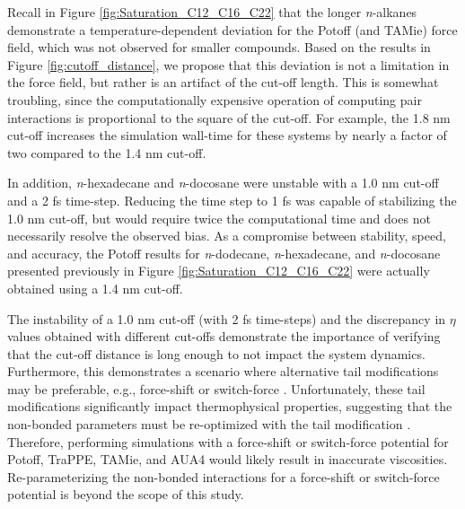 \documentclass[preprint,review,12pt]{elsarticle}
\begin{document}
	Recall in Figure \ref{fig:Saturation_C12_C16_C22} that the longer \textit{n}-alkanes demonstrate a temperature-dependent deviation for the Potoff (and TAMie) force field, which was not observed for smaller compounds. Based on the results in Figure \ref{fig:cutoff_distance}, we propose that this deviation is not a limitation in the force field, but rather is an artifact of the cut-off length. This is somewhat troubling, since the computationally expensive operation of computing pair interactions is proportional to the square of the cut-off. For example, the 1.8 nm cut-off increases the simulation wall-time for these systems by nearly a factor of two compared to the 1.4 nm cut-off.
	
	In addition, \textit{n}-hexadecane and \textit{n}-docosane were unstable with a 1.0 nm cut-off and a 2 fs time-step. Reducing the time step to 1 fs was capable of stabilizing the 1.0 nm cut-off, but would require twice the computational time and does not necessarily resolve the observed bias. As a compromise between stability, speed, and accuracy, the Potoff results for \textit{n}-dodecane, \textit{n}-hexadecane, and \textit{n}-docosane presented previously in Figure \ref{fig:Saturation_C12_C16_C22} were actually obtained using a 1.4 nm cut-off.
		
	
	
	
	
	The instability of a 1.0 nm cut-off (with 2 fs time-steps) and the discrepancy in $\eta$ values obtained with different cut-offs demonstrate the importance of verifying that the cut-off distance is long enough to not impact the system dynamics. Furthermore, this demonstrates a scenario where alternative tail modifications may be preferable, e.g., force-shift or switch-force \cite{GROMACS_2018}. Unfortunately, these tail modifications significantly impact thermophysical properties, suggesting that the non-bonded parameters must be re-optimized with the tail modification \cite{Thol_LJTS,Thol2016_LJ}. Therefore, performing simulations with a force-shift or switch-force potential for Potoff, TraPPE, TAMie, and AUA4 would likely result in inaccurate viscosities. Re-parameterizing the non-bonded interactions for a force-shift or switch-force potential is beyond the scope of this study.
	
\end{document}
